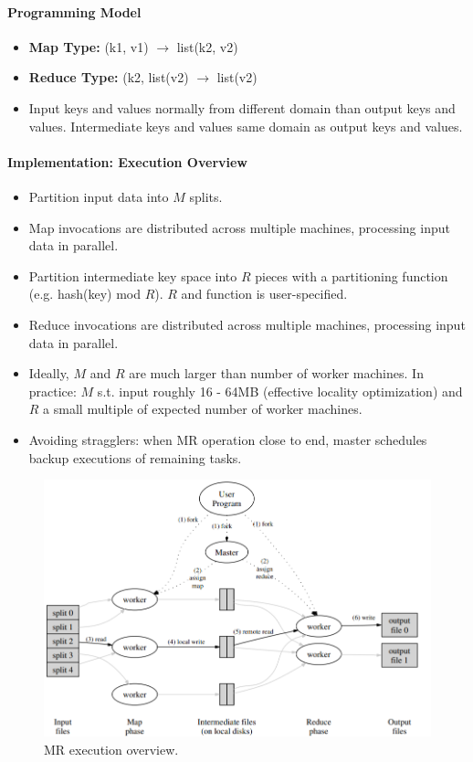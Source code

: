 \paragraph{Programming Model}
\begin{itemize}
    \item \textbf{Map Type:} (k1, v1) $\longrightarrow$ list(k2, v2)
    \item \textbf{Reduce Type:} (k2, list(v2) $\longrightarrow$ list(v2)
    \item Input keys and values normally from different domain than output keys and values. Intermediate keys and values same domain as output keys and values.
\end{itemize}

\paragraph{Implementation: Execution Overview}
\begin{itemize}
    \item Partition input data into $M$ splits.
    \item Map invocations are distributed across multiple machines, processing input data in parallel.
    \item Partition intermediate key space into $R$ pieces with a partitioning function (e.g. hash(key) mod $R$). $R$ and function is user-specified.
    \item Reduce invocations are distributed across multiple machines, processing input data in parallel.
    \item Ideally, $M$ and $R$ are much larger than number of worker machines. In practice: $M$ s.t. input roughly 16 - 64MB (effective locality optimization) and $R$ a small multiple of expected number of worker machines.
    \item Avoiding stragglers: when MR operation close to end, master schedules backup executions of remaining tasks.
\end{itemize}

\begin{figure}[h]
	\centering
	\includegraphics[scale=0.7]{images/4-MRexec.PNG}
	\caption{MR execution overview.}
	\label{fig:MR_exec}
\end{figure}

